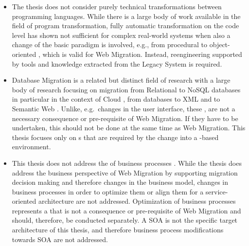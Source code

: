 \begin{itemize}
\tightlist
\item
  The thesis does not consider purely technical transformations between programming languages.
While there is a large body of work available in the field of program transformation, fully automatic transformation on the code level \autocite[cf.~family F1 in][]{Razavian2013PHD} has shown not sufficient for complex real-world systems when also a change of the basic paradigm is involved, e.g., from procedural to object-oriented \autocite{Sneed2010SoftwareMigration}, which is valid for \gls{Web Migration}.
Instead, reengineering \autocite{ISO/IEEE24765Vocabulary,IEEE1219Maintenance} supported by tools and knowledge extracted from the \gls{Legacy System} is required.
\item
  Database Migration is a related but distinct field of research with a large body of research focusing on migration from Relational to NoSQL databases \autocite{Karnitis2015,Zhao2014a,Rocha2015RelationalNoSQL} in particular in the context of Cloud \autocite{Strauch2013}, from databases to XML \autocite{Li2014,Tzvetkov2005} and to Semantic Web \autocite{Vavliakis2013,Vavliakis2011,XuanFan2010}.
Unlike, e.g.~changes in the user interface, these , are not a necessary consequence or pre-requisite of \gls{Web Migration}.
If they have to be undertaken, this should not be done at the same time as \gls{Web Migration}.
This thesis focuses only on s that are required by the change into a -based environment.
\item
  This thesis does not address the  of business processes \autocite[cf.~ADM Business Domain modernization@Perez-Castillo2011KDM; and family F3 in][]{Razavian2013PHD}.
While the thesis does address the business perspective of \gls{Web Migration} by supporting migration decision making and therefore changes in the business model, changes in business processes in order to optimize them or align them for a service-oriented architecture \autocite{Razavian2013PHD,Razavian2010SAPIENSA,Nguyen2009} are not addressed.
Optimization of business processes represents a  that is not a consequence or pre-requisite of \gls{Web Migration} and should, therefore, be conducted separately.
A SOA is not the specific target architecture of this thesis, and therefore business process modifications towards SOA are not addressed.

\end{itemize}
